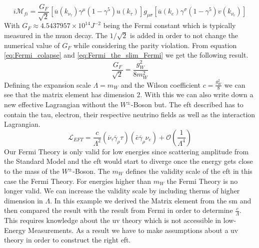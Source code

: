 \documentclass[../Bachelorarbeit.tex]{subfiles}
\begin{document}
\begin{equation}
    i\mathcal{M}_{fi} = \frac{G_{F}}{\sqrt{2}} \left[ \overline{u}(k_{\nu_{\tau}})\gamma^{\mu}(1-\gamma^{5})u(k_{\tau}) \right] g_{\mu\sigma} \left[ \overline{u}(k_{e})\gamma^{\sigma}(1-\gamma^{5})v(k_{\overline{\nu_{e}}}) \right]
    \label{eq:Fermi_the_slim_Fermi}
\end{equation}
With $G_{F} \approx 4.5437957\times 10^{14} J^{-2}$ being the Fermi constant which is typically measured in the muon decay. The $1/\sqrt{2}$ is added in order to not change the numerical value of $G_{F}$ while considering the parity violation.
From equation \ref{eq:Fermi_colapse} and \ref{eq:Fermi_the_slim_Fermi} we get the following result.
\begin{equation}
    \frac{G_{F}}{\sqrt{2}} = \frac{g_{W}^{2}}{8 m_{W}^{2}}
\end{equation}
Defining the expansion scale $\Lambda=m_{W}$ and the Wilson coefficient $c= \frac{g_{W}^{2}}{8}$ we can see that the matrix element has dimension 2.
With this we can also write down a new effective Lagrangian without the $W^{\pm }$-Boson but. The \acrshort{eft} described has to contain the tau, electron, their respective neutrino fields
as well as the interaction Lagrangian.
\begin{equation}
    \mathcal{L}_{EFT} = \frac{c}{\Lambda^{2}} \left( \overline{\nu}_{\tau} \overline{\gamma}_{\rho} \tau \right) \left(\bar{e} \overline{\gamma}_{\rho} \nu_{e} \right) + \mathcal{O}(\frac{1}{\Lambda^{4}})
\end{equation}
Our Fermi Theory is only valid for low energies since scattering amplitude from the Standard Model and the \acrshort{eft} would
start to diverge once the energy gets close to the mass of the $W^{\pm}$-Boson.
The $m_{W}$ defines the validity scale of the \acrshort{eft} in this case the Fermi Theory. For energies higher than $m_{W}$ the
Fermi Theory is no longer valid. We can increase the validity scale by including therms of higher dimension in $\Lambda$.
In this example we derived the Matrix element from the \acrshort{sm} and then compared the result with the result from Fermi in
order to determine $\frac{c}{\Lambda}$. This requires knowledge about the \acrshort{uv} theory which is not accessible in low-Energy
Measurements. As a result we have to make assumptions about a \acrshort{uv} theory in order to construct the right \acrshort{eft}.

%
\end{document}
